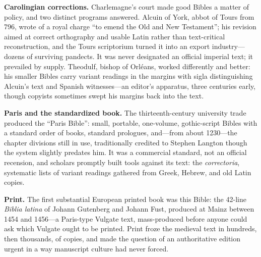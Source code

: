 \textbf{Carolingian corrections.} Charlemagne's court made good Bibles a
matter of policy, and two distinct programs answered. Alcuin of York,
abbot of Tours from 796, wrote of a royal charge ``to emend the Old and
New Testament''; his revision aimed at correct orthography and usable
Latin rather than text-critical reconstruction, and the Tours scriptorium
turned it into an export industry---dozens of surviving pandects. It was
never designated an official imperial text; it prevailed by supply.
Theodulf, bishop of Orl\'eans, worked differently and better: his
smaller Bibles carry variant readings in the margins with sigla
distinguishing Alcuin's text and Spanish witnesses---an editor's
apparatus, three centuries early, though copyists sometimes swept his
margins back into the text.

\textbf{Paris and the standardized book.} The thirteenth-century
university trade produced the ``Paris Bible'': small, portable,
one-volume, gothic-script Bibles with a standard order of books, standard
prologues, and---from about 1230---the chapter divisions still in use,
traditionally credited to Stephen Langton though the system slightly
predates him. It was a commercial standard, not an official recension,
and scholars promptly built tools against its text: the
\textit{correctoria}, systematic lists of variant readings gathered from
Greek, Hebrew, and old Latin copies.

\textbf{Print.} The first substantial European printed book was this
Bible: the 42-line \textit{Biblia latina} of Johann Gutenberg and Johann
Fust, produced at Mainz between 1454 and 1456---a Paris-type Vulgate
text, mass-produced before anyone could ask which Vulgate ought to be
printed. Print froze the medieval text in hundreds, then thousands, of
copies, and made the question of an authoritative edition urgent in a
way manuscript culture had never forced.
